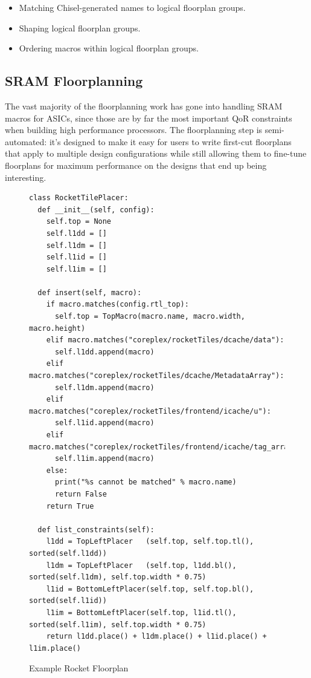 \documentclass{article}
\begin{document}
\begin{itemize}
\item Matching Chisel-generated names to logical floorplan groups.
\item Shaping logical floorplan groups.
\item Ordering macros within logical floorplan groups.
\end{itemize}

\subsection{SRAM Floorplanning}

The vast majority of the floorplanning work has gone into handling SRAM macros
for ASICs, since those are by far the most important QoR constraints when
building high performance processors.  The floorplanning step is
semi-automated: it's designed to make it easy for users to write first-cut
floorplans that apply to multiple design configurations while still allowing
them to fine-tune floorplans for maximum performance on the designs that end up
being interesting.

\begin{figure}
  \tiny
  \begin{verbatim}
class RocketTilePlacer:
  def __init__(self, config):
    self.top = None
    self.l1dd = []
    self.l1dm = []
    self.l1id = []
    self.l1im = []

  def insert(self, macro):
    if macro.matches(config.rtl_top):
      self.top = TopMacro(macro.name, macro.width, macro.height)
    elif macro.matches("coreplex/rocketTiles/dcache/data"):
      self.l1dd.append(macro)
    elif macro.matches("coreplex/rocketTiles/dcache/MetadataArray"):
      self.l1dm.append(macro)
    elif macro.matches("coreplex/rocketTiles/frontend/icache/u"):
      self.l1id.append(macro)
    elif macro.matches("coreplex/rocketTiles/frontend/icache/tag_array/tag_array"):
      self.l1im.append(macro)
    else:
      print("%s cannot be matched" % macro.name)
      return False
    return True

  def list_constraints(self):
    l1dd = TopLeftPlacer   (self.top, self.top.tl(), sorted(self.l1dd))
    l1dm = TopLeftPlacer   (self.top, l1dd.bl(),     sorted(self.l1dm), self.top.width * 0.75)
    l1id = BottomLeftPlacer(self.top, self.top.bl(), sorted(self.l1id))
    l1im = BottomLeftPlacer(self.top, l1id.tl(),     sorted(self.l1im), self.top.width * 0.75)
    return l1dd.place() + l1dm.place() + l1id.place() + l1im.place()
\end{verbatim}

  \caption{Example Rocket Floorplan}
  \label{impl:example-floorplan}
\end{figure}
\end{document}
